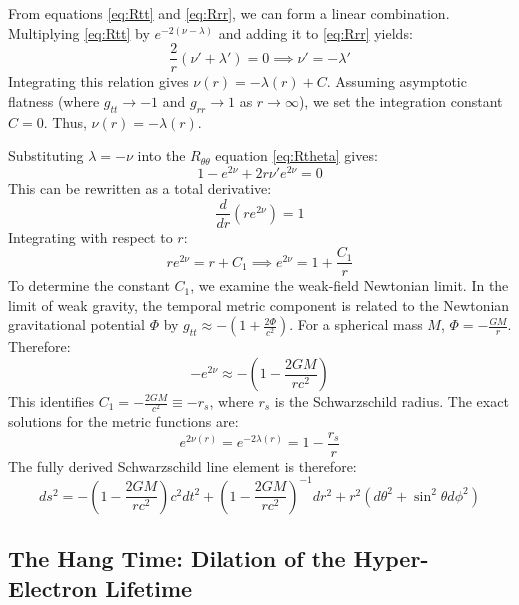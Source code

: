 From equations \eqref{eq:Rtt} and \eqref{eq:Rrr}, we can form a linear combination. Multiplying \eqref{eq:Rtt} by $e^{-2(\nu-\lambda)}$ and adding it to \eqref{eq:Rrr} yields:
\begin{equation}
\frac{2}{r}(\nu' + \lambda') = 0 \implies \nu' = -\lambda'
\end{equation}
Integrating this relation gives $\nu(r) = -\lambda(r) + C$. Assuming asymptotic flatness (where $g_{tt} \to -1$ and $g_{rr} \to 1$ as $r \to \infty$), we set the integration constant $C = 0$. Thus, $\nu(r) = -\lambda(r)$.

Substituting $\lambda = -\nu$ into the $R_{\theta\theta}$ equation \eqref{eq:Rtheta} gives:
\begin{equation}
1 - e^{2\nu} + 2r\nu' e^{2\nu} = 0
\end{equation}
This can be rewritten as a total derivative:
\begin{equation}
\frac{d}{dr} \left( r e^{2\nu} \right) = 1
\end{equation}
Integrating with respect to $r$:
\begin{equation}
r e^{2\nu} = r + C_1 \implies e^{2\nu} = 1 + \frac{C_1}{r}
\end{equation}
To determine the constant $C_1$, we examine the weak-field Newtonian limit. In the limit of weak gravity, the temporal metric component is related to the Newtonian gravitational potential $\Phi$ by $g_{tt} \approx -(1 + \frac{2\Phi}{c^2})$. For a spherical mass $M$, $\Phi = -\frac{GM}{r}$. Therefore:
\begin{equation}
-e^{2\nu} \approx -\left(1 - \frac{2GM}{rc^2}\right)
\end{equation}
This identifies $C_1 = -\frac{2GM}{c^2} \equiv -r_s$, where $r_s$ is the Schwarzschild radius. The exact solutions for the metric functions are:
\begin{equation}
e^{2\nu(r)} = e^{-2\lambda(r)} = 1 - \frac{r_s}{r}
\end{equation}
The fully derived Schwarzschild line element is therefore:
\begin{equation}
ds^2 = -\left(1 - \frac{2GM}{rc^2}\right) c^2 dt^2 + \left(1 - \frac{2GM}{rc^2}\right)^{-1} dr^2 + r^2(d\theta^2 + \sin^2\theta d\phi^2)
\end{equation}

\subsection{The Hang Time: Dilation of the Hyper-Electron Lifetime}

